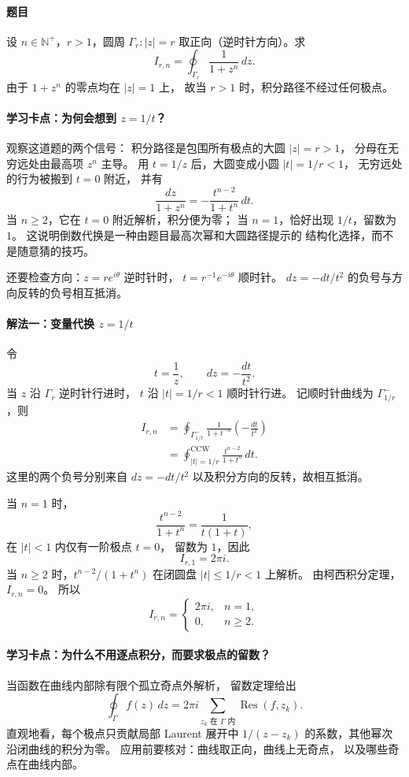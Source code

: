 \paragraph{题目}
设 $n\in\mathbb N^+$，$r>1$，圆周
$\Gamma_r:|z|=r$ 取正向（逆时针方向）。求
\[
  I_{r,n}=\oint_{\Gamma_r}\frac{1}{1+z^n}\,dz.
\]
由于 $1+z^n$ 的零点均在 $|z|=1$ 上，
故当 $r>1$ 时，积分路径不经过任何极点。


\paragraph{学习卡点：为何会想到 $z=1/t$？}
观察这道题的两个信号：
积分路径是包围所有极点的大圆 $|z|=r>1$，
分母在无穷远处由最高项 $z^n$ 主导。
用 $t=1/z$ 后，大圆变成小圆 $|t|=1/r<1$，
无穷远处的行为被搬到 $t=0$ 附近，
并有
\[
 \frac{dz}{1+z^n}
 =-\frac{t^{n-2}}{1+t^n}\,dt.
\]
当 $n\ge2$，它在 $t=0$ 附近解析，积分便为零；
当 $n=1$，恰好出现 $1/t$，留数为 $1$。
这说明倒数代换是一种由题目最高次幂和大圆路径提示的
结构化选择，而不是随意猜的技巧。

还要检查方向：$z=re^{i\theta}$ 逆时针时，
$t=r^{-1}e^{-i\theta}$ 顺时针。
$dz=-dt/t^2$ 的负号与方向反转的负号相互抵消。


\paragraph{解法一：变量代换 $z=1/t$}
令
\[
  t=\frac1z,\qquad dz=-\frac{dt}{t^2}.
\]
当 $z$ 沿 $\Gamma_r$ 逆时针行进时，
$t$ 沿 $|t|=1/r<1$ 顺时针行进。
记顺时针曲线为 $\Gamma_{1/r}^{-}$，则
\begin{align*}
  I_{r,n}
  &=\oint_{\Gamma_{1/r}^{-}}
       \frac{1}{1+t^{-n}}\left(-\frac{dt}{t^2}\right)\\
  &=\oint_{|t|=1/r}^{\mathrm{CCW}}
       \frac{t^{n-2}}{1+t^n}\,dt.
\end{align*}
这里的两个负号分别来自 $dz=-dt/t^2$
以及积分方向的反转，故相互抵消。

当 $n=1$ 时，
\[
  \frac{t^{n-2}}{1+t^n}=\frac{1}{t(1+t)},
\]
在 $|t|<1$ 内仅有一阶极点 $t=0$，
留数为 $1$，因此
\[
  I_{r,1}=2\pi i.
\]
当 $n\ge2$ 时，$t^{n-2}/(1+t^n)$
在闭圆盘 $|t|\le1/r<1$ 上解析。
由柯西积分定理，$I_{r,n}=0$。
所以
\[
  \boxed{I_{r,n}=
    \begin{cases}
      2\pi i, & n=1,\\
      0, & n\ge2.
    \end{cases}}
\]


\paragraph{学习卡点：为什么不用逐点积分，而要求极点的留数？}
当函数在曲线内部除有限个孤立奇点外解析，
留数定理给出
\[
 \oint_\Gamma f(z)\,dz
 =2\pi i\sum_{z_k\text{ 在 }\Gamma\text{ 内}}
      \operatorname{Res}(f,z_k).
\]
直观地看，每个极点只贡献局部 Laurent 展开中
$1/(z-z_k)$ 的系数，其他幂次沿闭曲线的积分为零。
应用前要核对：曲线取正向，曲线上无奇点，
以及哪些奇点在曲线内部。


